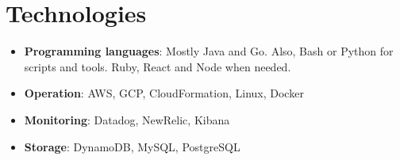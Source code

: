 \documentclass[letterpaper,11pt]{article}
\newcommand{\itemInline}[2]{
  \item\small{
    \textbf{#1}{: #2 \vspace{-4pt}}
  }
}
\newcommand{\itemListStart}{\begin{itemize}}
\newcommand{\itemListEnd}{\end{itemize}\vspace{-5pt}}
\begin{document}
  \section{Technologies}
  \itemListStart
    \itemInline{Programming languages}{Mostly Java and Go. Also, Bash or Python for scripts and tools. Ruby, React and Node when needed.}
    \itemInline{Operation}{AWS, GCP, CloudFormation, Linux, Docker}
    \itemInline{Monitoring}{Datadog, NewRelic, Kibana}
    \itemInline{Storage}{DynamoDB, MySQL, PostgreSQL}
  \itemListEnd
\end{document}
